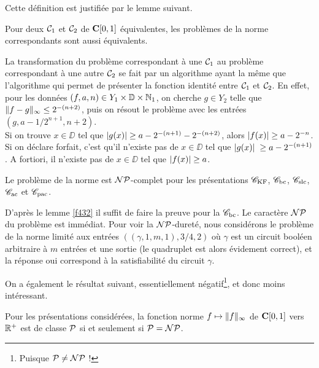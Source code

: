 Cette définition est justifiée par le lemme suivant.

\begin{flemma} \label{f432}
Pour deux \rps   ${{\cal C}}_1$ et ${{\cal C}}_2$  de  ${{\bf C}[0,1]}$  \polt équivalentes, 
les problèmes de la norme correspondants sont aussi \polt 
équivalents.
\end{flemma}

\proof 
La transformation du problème correspondant à une \pres ${{\cal C}}_1$ au 
problème correspondant à une autre \pres  ${{\cal C}}_2$  se fait par un algorithme 
ayant la même \com que l'algorithme qui permet de présenter la fonction 
identité entre  ${{\cal C}}_1$  et  ${{\cal C}}_2$. En effet, pour les données  $(f,a,n) 
\in Y_1 \times \mathbb {D} \times \mathbb {N}_1$, on cherche 
$g \in Y_2$ telle que  $\lVert  f-g  \rVert_{\infty} \leq 2^{-(n+2)}$,
 puis on résout le problème avec les entrées  $(g,a-1/2^{n+1}, n+2)$. 
 \\
Si on trouve  $x \in \DD$  tel que 
$\left|{g(x)}\right|  \geq a - 2^{-(n+1)}- 2^{-(n+2)}$,  alors 
$\left|{f(x)}\right|  \geq a - 2^{-n}$. 
\\ 
Si on déclare forfait, c'est qu'il n'existe pas de $x \in \DD$ tel que 
$\left|{g(x)}\right|\;  \geq a - 2^{-(n+1)}$. 
A fortiori, il n'existe pas de  
$x \in \DD$  tel que  $\left|{f(x)}\right| \geq a$.   
\eop

\begin{ftheorem} \label{f433}
Le problème de la norme est ${\cal NP}$-complet pour les présentations  ${{{\mathscr C}}_{\rm KF}}$,  
${{{\mathscr C}}_{\rm bc}}$,  ${{{\mathscr C}}_{\rm slc}}$,  ${{{\mathscr C}}_{\rm ac}}$   et   ${{{\mathscr C}}_{\rm pac}}$.
\end{ftheorem}

\proof 
D'après le lemme \ref{f432} il suffit de faire la preuve pour la \pres ${{{\mathscr C}}_{\rm bc}}$. 
Le caractère  ${\cal NP}$  du problème est immédiat.  
Pour voir la  ${\cal NP}$-dureté, nous considérons le problème de la norme 
limité aux entrées  $((\gamma,1,m,1), 3/4, 2)$  où  $\gamma$  
est un circuit booléen arbitraire à  $m$  entrées et une sortie 
(le quadruplet est alors évidement correct), et la réponse oui 
correspond à la satisfiabilité du circuit  $\gamma$.  \eop

\medskip On a également le résultat suivant, essentiellement 
négatif{\footnote{Puisque  ${\cal P} \neq {\cal NP}$ !}}, et donc moins intéressant.

\begin{fproposition} \label{f434}
Pour les présentations considérées, la fonction norme  
$f \mapsto \lVert  f  \rVert_{\infty}$ de ${{\bf C}[0,1]}$  vers  $\mathbb {R}^{+}$ est \uni 
de classe ${\cal P}$  si et seulement si  ${\cal P} = {\cal NP}$.
\end{fproposition}

